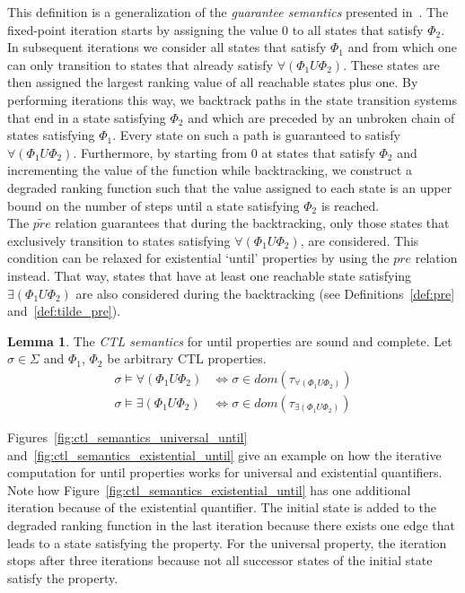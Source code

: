 \documentclass[11pt,a4paper,titlepage]{article}
\theoremstyle{definition}
\newtheorem{lemma}[theorem]{Lemma}
\begin{document}
This definition is a generalization of the \textit{guarantee semantics} presented in~\cite{UrbanM-VMCAI15}. 
The fixed-point iteration starts by assigning the value $0$ to all states that satisfy $\Phi_2$. 
In subsequent iterations we consider all states that satisfy $\Phi_1$ and from which one can only transition to states that already satisfy  
$\forall(\Phi_1 U \Phi_2)$. These states are then assigned the largest ranking value of all reachable states plus one. 
By performing iterations this way, we backtrack paths in the state transition systems that end in a state satisfying $\Phi_2$ and which are preceded by an 
unbroken chain of states satisfying $\Phi_1$. Every state on such a path is guaranteed to satisfy $\forall(\Phi_1 U \Phi_2)$. 
Furthermore, by starting from $0$ at states that satisfy $\Phi_2$ and incrementing the value of the function while backtracking, 
we construct a degraded ranking function such that the value assigned to each state is an 
upper bound on the number of steps until a state satisfying $\Phi_2$ is reached.\\

The $\widetilde{pre}$ relation guarantees that during the backtracking, only those states that
exclusively transition to states satisfying $\forall(\Phi_1 U \Phi_2)$, are considered. 
This condition can be relaxed for existential `until' properties by using the $pre$ relation instead. 
That way, states that have at least one reachable state satisfying $\exists(\Phi_1 U \Phi_2)$ are also considered 
during the backtracking (see Definitions~\ref{def:pre} and~\ref{def:tilde_pre}).\\

\begin{lemma}\label{lem:ctl_semantics_until}
    The \textit{CTL semantics} for \textsf{until} properties are sound and complete. 
    Let $\sigma \in \Sigma$ and $\Phi_1$, $\Phi_2$ be arbitrary CTL properties.
    \begin{align}
        \sigma \models \forall(\Phi_1 U \Phi_2) &\iff \sigma \in dom(\tau_{\forall(\Phi_1 U \Phi_2)})\\
        \sigma \models \exists(\Phi_1 U \Phi_2) &\iff \sigma \in dom(\tau_{\exists(\Phi_1 U \Phi_2)})
    \end{align}
\end{lemma}


Figures~\ref{fig:ctl_semantics_universal_until} and~\ref{fig:ctl_semantics_existential_until} give an example on how the
iterative computation for \textsf{until} properties works for universal and existential quantifiers. 
Note how Figure~\ref{fig:ctl_semantics_existential_until} has one additional iteration because of the existential quantifier. 
The initial state is added to the degraded ranking function in the last iteration because there exists one edge that leads to a state satisfying the property.  
For the universal property, the iteration stops after three iterations because not all successor states
of the initial state satisfy the property.
\end{document}
